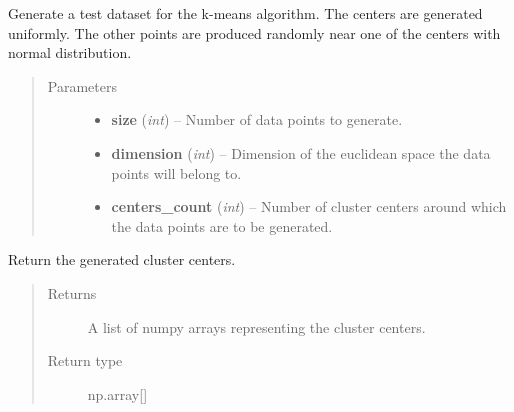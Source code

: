\documentclass[letterpaper,10pt,english]{sphinxmanual}
\begin{document}
\begin{fulllineitems}
\label{kmeans:kmeans_data_generator.KmeansRandomDataGenerator}
Generate a test dataset for the k-means algorithm. The centers are generated uniformly.
The other points are produced randomly near one of the centers with normal distribution.
\begin{quote}\begin{description}
\item[{Parameters}] \leavevmode\begin{itemize}
\item {} 
\textbf{size} (\emph{int}) -- Number of data points to generate.

\item {} 
\textbf{dimension} (\emph{int}) -- Dimension of the euclidean space the data points will belong to.

\item {} 
\textbf{centers\_count} (\emph{int}) -- Number of cluster centers around which the data points are to be generated.

\end{itemize}

\end{description}\end{quote}

\begin{fulllineitems}
\label{kmeans:kmeans_data_generator.KmeansRandomDataGenerator.get_centers}
Return the generated cluster centers.
\begin{quote}\begin{description}
\item[{Returns}] \leavevmode
A list of numpy arrays representing the cluster centers.

\item[{Return type}] \leavevmode
np.array{[}{]}

\end{description}\end{quote}

\end{fulllineitems}



\end{fulllineitems}
\end{document}
